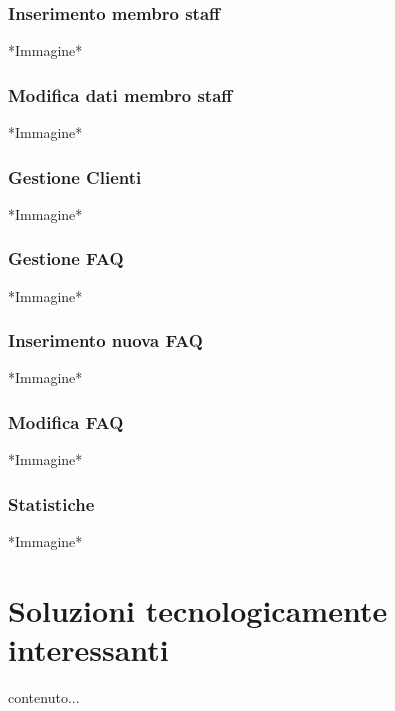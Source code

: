 \documentclass[12pt,a4paperS]{report}
\begin{document}
\begin{normalsize}
			\subsection{Inserimento membro staff}
				*Immagine*
			
			\subsection{Modifica dati membro staff}
				*Immagine*
			
			\subsection{Gestione Clienti}
				*Immagine*
		
			\subsection{Gestione FAQ}
				*Immagine*
			
			\subsection{Inserimento nuova FAQ}
				*Immagine*
			
			\subsection{Modifica FAQ}
				*Immagine*
			
			\subsection{Statistiche}
				*Immagine*
			
	\end{normalsize}
	
	\hypertarget{soluzioni}{\chapter{Soluzioni tecnologicamente interessanti}}
	\label{soluzioni}
	\begin{normalsize}
		contenuto...
	\end{normalsize}
\end{document}
